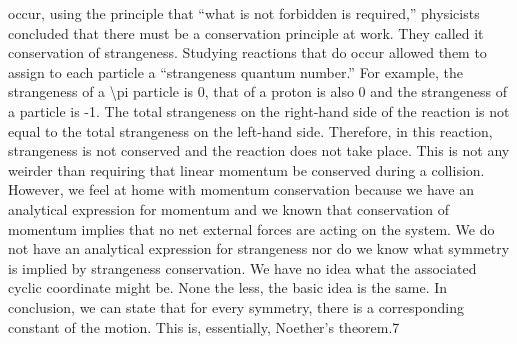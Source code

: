 \begin{exercise}
occur, using the principle that ``what is not forbidden is required,'' physicists
concluded that there must be a conservation principle at work. They called it
conservation of strangeness. Studying reactions that do occur allowed them
to assign to each particle a ``strangeness quantum number.'' For example, the
strangeness of a \textbackslash{}pi  particle is 0, that of a proton is also 0 and the strangeness
of a  particle is -1. The total strangeness on the right-hand side of the reaction is not equal to the total strangeness on the left-hand side. Therefore, in this
reaction, strangeness is not conserved and the reaction does not take place. This
is not any weirder than requiring that linear momentum be conserved during
a collision. However, we feel at home with momentum conservation because
we have an analytical expression for momentum and we known that conservation of momentum implies that no net external forces are acting on the system.
We do not have an analytical expression for strangeness nor do we know what
symmetry is implied by strangeness conservation. We have no idea what the
associated cyclic coordinate might be. None the less, the basic idea is the same.
In conclusion, we can state that for every symmetry, there is a corresponding
constant of the motion. This is, essentially, Noether's theorem.7
\end{exercise}

